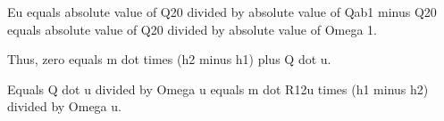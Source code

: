 Eu equals absolute value of Q20 divided by absolute value of Qab1 minus Q20 equals absolute value of Q20 divided by absolute value of Omega 1.

Thus, zero equals m dot times (h2 minus h1) plus Q dot u.

Equals Q dot u divided by Omega u equals m dot R12u times (h1 minus h2) divided by Omega u.